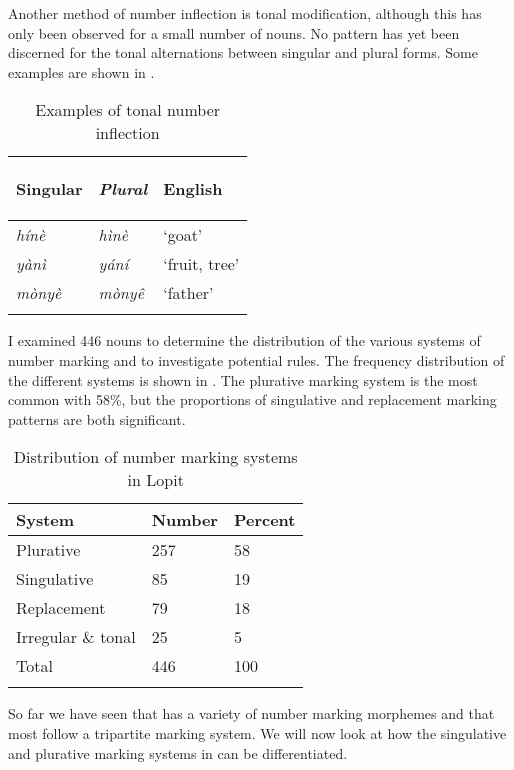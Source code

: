 \documentclass[output=paper]{langsci/langscibook}
\begin{document}
\largerpage[2] 
Another method of number inflection is tonal modification, although this has only been observed for a small number of nouns. No pattern has yet been discerned for the tonal alternations between singular and plural forms. Some examples are shown in .
\clearpage

\begin{table}
\begin{tabularx}{\textwidth}{>{\itshape}X>{\itshape}XX}
\lsptoprule

  \textup{Singular} &   \textup{Plural} &   {English}\\
\midrule
 hínè &  hìnè &  ‘goat’\\
 yànì &  yání &  ‘fruit, tree’\\
 mònyè &  mòny\^{e} &  ‘father’\\
\lspbottomrule
\end{tabularx}
\caption{Examples of tonal number inflection}
\label{tab:moodie:4}
\end{table}

I examined 446  nouns to determine the distribution of the various systems of number marking and to investigate potential rules. The frequency distribution of the different systems is shown in . The plurative marking system is the most common with 58\%, but the proportions of singulative and replacement marking patterns are both significant. 

\begin{table}
\begin{tabularx}{\textwidth}{XXX}
\lsptoprule

  {System } &   {Number} &   {Percent}\\ 
\midrule
Plurative & 257 & 58\\
Singulative & 85 & 19\\
Replacement & 79 & 18\\
Irregular \& tonal & 25 & 5\\
\midrule 
Total & 446 & 100\\
\lspbottomrule
\end{tabularx}
\caption{Distribution of number marking systems in Lopit}
\label{tab:moodie:5}
\end{table}

So far we have seen that  has a variety of number marking morphemes and that most follow a tripartite marking system. We will now look at how the singulative and plurative marking systems in  can be differentiated.
\end{document}
